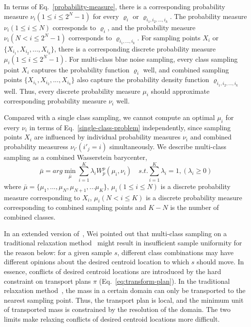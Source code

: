 In terms of Eq.~\ref{probability-measure},
there is a corresponding probability measure $\nu_i(1\leq i\leq 2^N-1)$ for every $\varrho_i$ or  $\varrho_{{i_1,i_2,...,i_k}}$.
The probability measure $\nu_i(1\leq i\leq N)$ corresponds to $\varrho_i$,
and the probability measure $\nu_i(N<i\leq 2^N-1)$ corresponds to $\varrho_{i_1,...,i_k}$.
For sampling points $X_i$ or $\{X_{i_1}, X_{i_2},...,X_{i_k}\}$,
there is a corresponding discrete probability measure $\mu_i(1\leq i\leq 2^N-1)$.
For multi-class blue noise sampling,
every class sampling point $X_i$ captures the probability function $\varrho_i$ well,
and combined sampling points $\{X_{i_1}, X_{i_2},...,X_{i_k}\}$ also capture the probability density function $\varrho_{i_1,i_2,...,i_k}$ well.
Thus,
every discrete probability measure $\mu_i$ should approximate corresponding probability measure $\nu_i$ well.

Compared with a single class sampling,
we cannot compute an optimal $\mu_i$ for every $\nu_i$ in terms of Eq.~\ref{single-class-problem} independently,
since sampling points $X_i$ are influenced by individual probability measures $\nu_i$ and combined probability measuress $\nu_{i'}(i'_j=i)$ simultaneously.
We describe multi-class sampling as a combined Wasserstein barycenter,
\begin{equation}\label{eq:combined-wasserstein-barycenter}
 \bar\mu=arg\min\limits_{\bar\mu}\sum\limits_{i=1}^K\lambda_iW_p^p(\mu_i,\nu_i) \quad
  s.t.\sum\limits_{i=1}^K\lambda_i=1,(\lambda_i\geq0)
\end{equation}
where $\bar\mu=\{\mu_1,...,\mu_N,\mu_{N+1},...\mu_{K}\}$,
$\mu_i(1\leq i\leq N)$  is a discrete probability measure corresponding to $X_i$,
$\mu_i(N < i\leq K)$ is a discrete probability measure corresponding to combined sampling points and
$K-N$ is the number of combined classes.

In an extended version of~\cite{wei:2010:multi},
Wei pointed out that multi-class sampling on a traditional relaxation method~\cite{balzer:2009:capacity}
 might result in insufficient sample
uniformity for the reason below: for a given sample $s$,
different class combinations may have different opinions about the desired centroid
location to which $s$ should move.
In essence,
conflicts of desired centroid locations are introduced by the hard constraint on transport plans $\pi$ (Eq.~\ref{eq:transform-plan}).
In the traditional relaxation method~\cite{balzer:2009:capacity},
the mass in a certain domain can only be transported to the nearest sampling point.
Thus, the transport plan is local,
and the minimum unit of transported mass is constrained by the resolution of the domain.
The two limits make relaxing conflicts of desired centroid locations more difficult.

